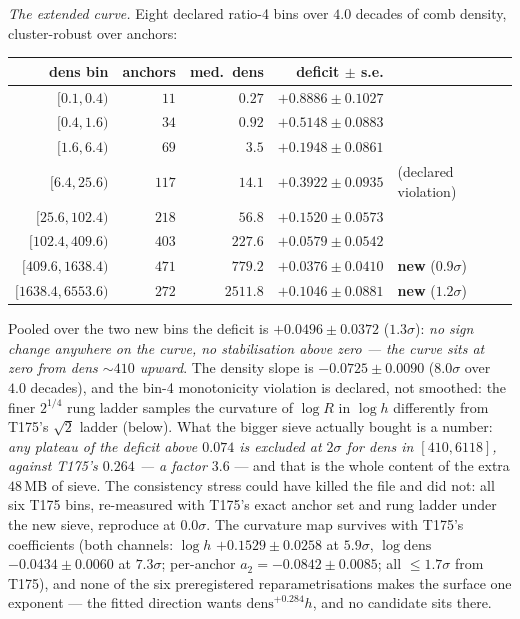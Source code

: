 \documentclass[11pt,a4paper]{article}
\begin{document}
\emph{The extended curve.} Eight declared ratio-4 bins over $4.0$
decades of comb density, cluster-robust over anchors:

\begin{center}\small
\begin{tabular}{@{}r r r r l@{}}
\toprule
dens bin & anchors & med.\ dens & deficit $\pm$ s.e. & \\
\midrule
$[0.1,0.4)$ & $11$ & $0.27$ & $+0.8886\pm0.1027$ & \\
$[0.4,1.6)$ & $34$ & $0.92$ & $+0.5148\pm0.0883$ & \\
$[1.6,6.4)$ & $69$ & $3.5$ & $+0.1948\pm0.0861$ & \\
$[6.4,25.6)$ & $117$ & $14.1$ & $+0.3922\pm0.0935$ & (declared violation)\\
$[25.6,102.4)$ & $218$ & $56.8$ & $+0.1520\pm0.0573$ & \\
$[102.4,409.6)$ & $403$ & $227.6$ & $+0.0579\pm0.0542$ & \\
$[409.6,1638.4)$ & $471$ & $779.2$ & $+0.0376\pm0.0410$ & \textbf{new} ($0.9\sigma$)\\
$[1638.4,6553.6)$ & $272$ & $2511.8$ & $+0.1046\pm0.0881$ & \textbf{new} ($1.2\sigma$)\\
\bottomrule
\end{tabular}
\end{center}

\noindent Pooled over the two new bins the deficit is
$+0.0496\pm0.0372$ ($1.3\sigma$): \emph{no sign change anywhere on the
curve, no stabilisation above zero --- the curve sits at zero from
dens ${\sim}410$ upward}. The density slope is $-0.0725\pm0.0090$
($8.0\sigma$ over $4.0$ decades), and the bin-4 monotonicity violation
is declared, not smoothed: the finer $2^{1/4}$ rung ladder samples the
curvature of $\log R$ in $\log h$ differently from T175's $\sqrt2$
ladder (below). What the bigger sieve actually bought is a number:
\emph{any plateau of the deficit above $0.074$ is excluded at
$2\sigma$ for dens in $[410,6118]$, against T175's $0.264$ --- a
factor $3.6$} --- and that is the whole content of the extra
$48$\,MB of sieve. The consistency stress could have killed the file
and did not: all six T175 bins, re-measured with T175's exact anchor
set and rung ladder under the new sieve, reproduce at $0.0\sigma$.
The curvature map survives with T175's coefficients (both channels:
$\log h$ $+0.1529\pm0.0258$ at $5.9\sigma$, $\log\mathrm{dens}$
$-0.0434\pm0.0060$ at $7.3\sigma$; per-anchor $a_2=-0.0842\pm0.0085$;
all $\le1.7\sigma$ from T175), and none of the six preregistered
reparametrisations makes the surface one exponent --- the fitted
direction wants $\mathrm{dens}^{+0.284}h$, and no candidate sits
there.
\end{document}
